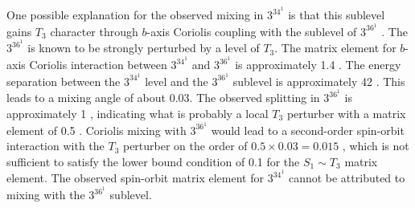 One possible explanation for the observed mixing in $3^34^1$ 
is that this sublevel gains $T_3$ character through $b$-axis Coriolis
coupling with the  sublevel of $3^36^1$ .  The $3^36^1$
 is known to be strongly perturbed by a level of $T_3$.  The
matrix element for $b$-axis Coriolis interaction between $3^34^1$
 and $3^36^1$  is approximately 1.4 \rcm.  The energy
separation between the $3^34^1$  level and the $3^36^1$ 
sublevel is approximately 42 \rcm.  This leads to a mixing angle of
about 0.03.  The observed splitting in $3^36^1$  is
approximately 1 \rcm, indicating what is probably a local $T_3$
perturber with a matrix element of 0.5 \rcm.  Coriolis mixing with
$3^36^1$  would lead to a second-order spin-orbit interaction
with the $T_3$ perturber on the order of $0.5 \times 0.03 = 0.015$
\rcm, which is not sufficient to satisfy the lower bound condition of
0.1 \rcm for the $S_1 \sim T_3$ matrix element.  The observed
spin-orbit matrix element for $3^34^1$  cannot be attributed to
mixing with the $3^36^1$  sublevel.



